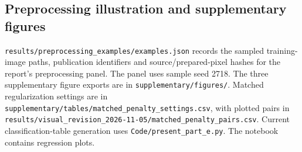 \subsection{Preprocessing illustration and supplementary figures}
\nolinkurl{results/preprocessing_examples/examples.json} records the sampled
training-image paths, publication identifiers and source/prepared-pixel
hashes for the report's preprocessing panel. The panel uses sample seed 2718.
The three supplementary figure exports are in
\nolinkurl{supplementary/figures/}. Matched regularization settings are in
\nolinkurl{supplementary/tables/matched_penalty_settings.csv}, with plotted
pairs in \nolinkurl{results/visual_revision_2026-11-05/matched_penalty_pairs.csv}.
Current classification-table generation uses
\nolinkurl{Code/present_part_e.py}. The notebook contains regression plots.
